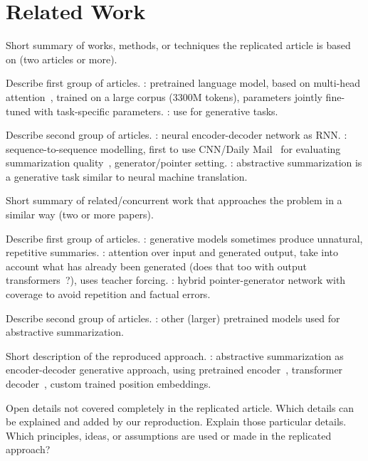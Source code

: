 \section{Related Work} %




Short summary of works, methods, or techniques the replicated article is based on (two articles or more).

Describe first group of articles.
\citeauthor{DevlinCLT2019}: pretrained language model, based on multi-head attention~\cite{VaswaniSPUJGKP2017}, trained on a large corpus (3300M tokens), \Bert parameters jointly fine-tuned with task-specific parameters.
\citeauthor{Edunov2019?,Rothe2019?}: use \Bert for generative tasks.

Describe second group of articles.
\citeauthor{Sutskever2014?,Chopra2016?,NallapatiZSGX2016}: neural encoder-decoder network as RNN.
\citeauthor{NallapatiZSGX2016}: sequence-to-sequence modelling, first to use CNN/Daily Mail~\cite{HermannKGEKSB2015} for evaluating summarization quality~\cite{T5}, generator/pointer setting.
\citeauthor{???}: abstractive summarization is a generative task similar to neural machine translation.



Short summary of related/concurrent work that approaches the problem in a similar way (two or more papers).

Describe first group of articles.
\citeauthor{Paulus2018,SeeLM2017}: generative models sometimes produce unnatural, repetitive summaries.
\citeauthor{Paulus2018}: attention over input and generated output, take into account what has already been generated (\Bert does that too with output transformers~\cite{DevlinCLT2019}?), uses teacher forcing.
\citeauthor{SeeLM2017}: hybrid pointer-generator network with coverage to avoid repetition and factual errors.

Describe second group of articles.
\citeauthor{???}: other (larger) pretrained models used for abstractive summarization.



Short description of the reproduced approach.
\citeauthor{LiuL2019}: abstractive summarization as encoder-decoder generative approach, using pretrained \Bert encoder~\cite{DevlinCLT2019}, transformer decoder~\cite{VaswaniSPUJGKP2017}, custom trained position embeddings.

Open details not covered completely in the replicated article.
Which details can be explained and added by our reproduction.
Explain those particular details.
Which principles, ideas, or assumptions are used or made in the replicated approach?
